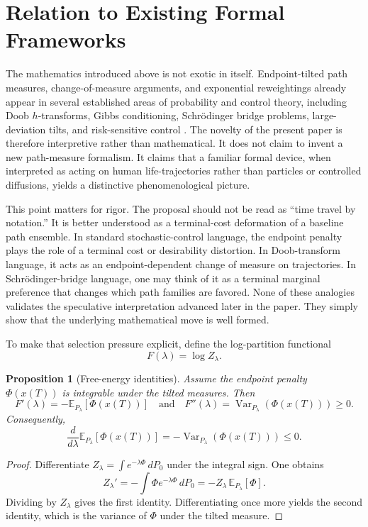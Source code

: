 \documentclass[12pt]{article}
\newtheorem{proposition}{Proposition}
\begin{document}
\section{Relation to Existing Formal Frameworks}

The mathematics introduced above is not exotic in itself. Endpoint-tilted path measures, change-of-measure arguments, and exponential reweightings already appear in several established areas of probability and control theory, including Doob $h$-transforms, Gibbs conditioning, Schr\"odinger bridge problems, large-deviation tilts, and risk-sensitive control \cite{doob1957, whittle1990, dupuis1997, leonard2014, todorov2009}. The novelty of the present paper is therefore interpretive rather than mathematical. It does not claim to invent a new path-measure formalism. It claims that a familiar formal device, when interpreted as acting on human life-trajectories rather than particles or controlled diffusions, yields a distinctive phenomenological picture.

This point matters for rigor. The proposal should not be read as ``time travel by notation.'' It is better understood as a terminal-cost deformation of a baseline path ensemble. In standard stochastic-control language, the endpoint penalty plays the role of a terminal cost or desirability distortion. In Doob-transform language, it acts as an endpoint-dependent change of measure on trajectories. In Schr\"odinger-bridge language, one may think of it as a terminal marginal preference that changes which path families are favored. None of these analogies validates the speculative interpretation advanced later in the paper. They simply show that the underlying mathematical move is well formed.

To make that selection pressure explicit, define the log-partition functional
\[
F(\lambda) = \log Z_\lambda.
\]

\begin{proposition}[Free-energy identities]
Assume the endpoint penalty $\Phi(x(T))$ is integrable under the tilted measures. Then
\[
F'(\lambda) = -\mathbb{E}_{P_\lambda}[\Phi(x(T))]
\quad\text{and}\quad
F''(\lambda) = \operatorname{Var}_{P_\lambda}(\Phi(x(T))) \ge 0.
\]
Consequently,
\[
\frac{d}{d\lambda}\mathbb{E}_{P_\lambda}[\Phi(x(T))] = -\operatorname{Var}_{P_\lambda}(\Phi(x(T))) \le 0.
\]
\end{proposition}

\begin{proof}
Differentiate $Z_\lambda = \int e^{-\lambda \Phi} \, dP_0$ under the integral sign. One obtains
\[
Z_\lambda' = -\int \Phi e^{-\lambda \Phi} \, dP_0 = -Z_\lambda\,\mathbb{E}_{P_\lambda}[\Phi].
\]
Dividing by $Z_\lambda$ gives the first identity. Differentiating once more yields the second identity, which is the variance of $\Phi$ under the tilted measure.
\end{proof}
\end{document}
